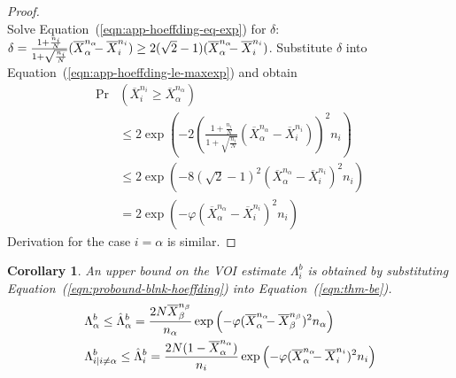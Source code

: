 \documentclass[]{article}
\newtheorem{crl}[thm]{Corollary}
\renewcommand{\eqref}[1]{Equation~(\ref{#1})}
\begin{document}
\begin{hiddenproof}
\begin{proof}
\begin{equation}
	\end{equation}
	Solve \eqref{eqn:app-hoeffding-eq-exp} for $\delta$: $\delta=\frac {1+\frac {n_i} N} {1+\sqrt {\frac {n_i} N}} (\overline X_\alpha^{n_\alpha}\hspace{-0.5em}
	- \overline X_i^{n_i}) \ge 2(\sqrt 2 - 1)(\overline X_\alpha^{n_\alpha}\hspace{-0.5em}-\overline X_i^{n_i})$. Substitute $\delta$ into 
	\eqref{eqn:app-hoeffding-le-maxexp} and obtain
	\begin{align}
	\Pr&(\overline X_i^{n_i}\ge \overline X_\alpha^{n_\alpha}) \nonumber\\
	& \le 2\exp\left(-2\left( \frac {1+\frac {n_i} N} {1+\sqrt {\frac {n_i} N}}
	                          (\overline X_\alpha^{n_\alpha} - \overline X_i^{n_i})\right)^2 n_i\right)\nonumber \\
	& \le 2\exp(-8(\sqrt 2 - 1)^2(\overline X_\alpha^{n_\alpha} - \overline X_i^{n_i})^2n_i)\nonumber\\
	& = 2\exp(-\varphi(\overline X_\alpha^{n_\alpha} - \overline X_i^{n_i})^2n_i)
	\end{align}
	Derivation for the case $i=\alpha$ is similar.
	\end{proof}	
\end{hiddenproof}

\begin{crl}
An upper bound on the VOI estimate $\Lambda_i^b$ is obtained
by substituting \eqref{eqn:probound-blnk-hoeffding} into \eqref{eqn:thm-be}.
\begin{align}
  \label{eqn:bound-blnk-hoeffding}
  \Lambda&_\alpha^b \le \hat\Lambda_\alpha^b=\frac {2N\overline X_\beta^{n_\beta}} {n_\alpha}\exp\left(- \varphi(\overline X_\alpha^{n_\alpha}\hspace{-0.5em} - \overline X_\beta^{n_\beta})^2 n_\alpha\right)\nonumber\\
  \Lambda&_{i|i\ne\alpha}^b\le \hat\Lambda_i^b=  \frac {2N(1-\overline  X_\alpha^{n_\alpha})} {n_i}\exp\left(- \varphi(\overline X_\alpha^{n_\alpha}\hspace{-0.5em} - \overline X_i^{n_i})^2 n_i\right)
\end{align}
\label{crl:bound-blnk-hoeffding}
\end{crl}
\vspace{-2em}
\end{document}
